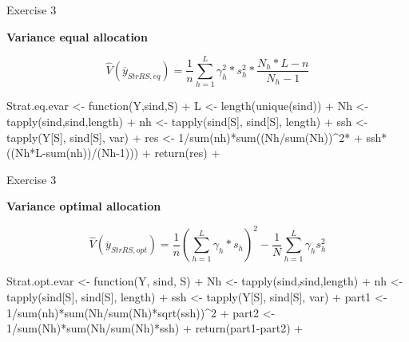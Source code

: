 \documentclass[11pt,german,hideothersubsections]{beamer}
\begin{document}
\begin{frame}[fragile]{Exercise 3}
\footnotesize{
\begin{center}
\textbf{Variance equal allocation}
\end{center}
\begin{equation*}
\hat{V}(\overline{y}_{StrRS,eq})=\frac{1}{n}\sum_{h=1}^{L}\gamma_h^2*s_h^2*\frac{N_h*L-n}{N_h-1}
\end{equation*}
\vspace{.5cm}
\begin{Schunk}
\begin{Sinput}
 Strat.eq.evar <- function(Y,sind,S){
+   L <- length(unique(sind))
+   Nh <- tapply(sind,sind,length)
+   nh <- tapply(sind[S], sind[S], length)
+   ssh <- tapply(Y[S], sind[S], var)
+   res <- 1/sum(nh)*sum((Nh/sum(Nh))^2*
+               ssh*((Nh*L-sum(nh))/(Nh-1)))
+   return(res)
+ }
\end{Sinput}
\end{Schunk}

}
\end{frame}
\begin{frame}[fragile]{Exercise 3}
\footnotesize{
\begin{center}
\textbf{Variance optimal allocation}
\end{center}
\begin{equation*}
\hat{V}(\overline{y}_{StrRS,opt})=\frac{1}{n}(\sum_{h=1}^{L}\gamma_h*s_h)^2-\frac{1}{N}\sum_{h=1}^{L}\gamma_hs_h^2
\end{equation*}
\vspace{.5cm}
\begin{Schunk}
\begin{Sinput}
 Strat.opt.evar <- function(Y, sind, S){
+   Nh <- tapply(sind,sind,length)
+   nh <- tapply(sind[S], sind[S], length)
+   ssh <- tapply(Y[S], sind[S], var)
+   part1 <- 1/sum(nh)*sum(Nh/sum(Nh)*sqrt(ssh))^2
+   part2 <- 1/sum(Nh)*sum(Nh/sum(Nh)*ssh)
+   return(part1-part2)
+ }
\end{Sinput}
\end{Schunk}

}
\end{frame}
\end{document}
